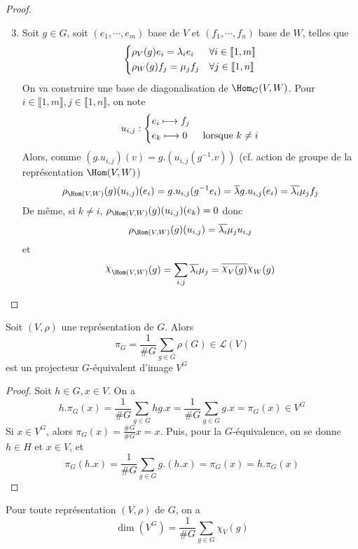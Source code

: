 \begin{proof}
\begin{enumerate}
    \setcounter{enumi}{2}
\item Soit $g \in  G$, soit $(e_1, \cdots , e_m)$ base de $V$ et  $(f_1, \cdots , f_n)$ base de $W$, telles que  \[
\begin{dcases}
    \rho_V(g)e_i=\lambda_i e_i & \forall  i \in  \llbracket 1, m \rrbracket \\
    \rho_W(g)f_j=\mu_jf_j & \forall  j \in  \llbracket 1, n \rrbracket 
\end{dcases}
\] 
On va construire une base de diagonalisation de $\Hom_G(V, W)$. Pour $i \in  \llbracket 1,m \rrbracket , j \in  \llbracket 1,n \rrbracket $, on note \[
u_{i,j}: \begin{dcases}
    e_i\longmapsto f_j\\
    e_k \longmapsto 0 & \text{ lorsque }k\neq i
\end{dcases}
\]
Alors, comme $(g.u_{i,j})(v)=g.(u_{i,j}(g^{-1}.v))$ (cf. action de groupe de la représentation $\Hom(V, W)$) \[
    \rho_{\Hom(V, W)}(g)(u_{i,j})(e_i)=g.u_{i,j}(g^{-1}e_i)=\bar{\lambda} g.u_{i,j}(e_i)=\bar{\lambda_i}\mu_j f_j
\]
De même, si $k\neq i$,  $\rho_{\Hom(V, W)}(g)(u_{i,j})(e_k)=0$ donc \[\rho_{\Hom(V, W)}(g)(u_{i,j})=\bar{\lambda_i}\mu_ju_{i,j}\] et \[
\chi_{\Hom(V, W)}(g)=\sum_{i,j}\bar{\lambda_i}\mu_j=\bar{\chi_V(g)}\chi_W(g)
\] 
\end{enumerate}
\end{proof}

\begin{prop}
    Soit $(V, \rho)$ une représentation de  $G$. Alors  \[
        \pi_G=\frac1{\#G} \sum_{g \in  G}\rho(G) \in  \mathcal  L(V)
    \] 
    est un projecteur $G$-équivalent d'image  $V^G$
\end{prop}

\begin{proof}
    Soit  $h \in  G, x \in  V$. On a \[
        h.\pi_G(x)=\frac1{\#G}\sum_{g \in  G}hg.x=\frac1{\#G}\sum_{g \in  G}g.x=\pi_G(x) \in V^G
    \] 
    Si $x \in  V^G$, alors $\pi_G(x)=\frac{\#G}{\#G}x=x$. Puis, pour la  $G$-équivalence, on se donne  $h \in  H$ et $x \in  V$, et \[
        \pi_G(h.x)=\frac1{\#G}\sum_{g \in  G}g.(h.x)=\pi_G(x)=h.\pi_G(x)
    \] 
\end{proof}

\begin{cor}
    Pour toute représentation $(V, \rho)$ de $G$, on a \[
        \dim(V^G)=\frac1{\#G}\sum_{g \in  G}\chi_V(g)
    \] 
\end{cor}

